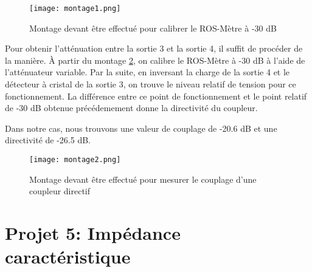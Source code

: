 \begin{figure}[htbp]
    \centering
    \texttt{[image: montage1.png]}
    \caption{Montage devant être effectué pour calibrer le ROS-Mètre à -30 dB}
    \label{montage1}
\end{figure}

Pour obtenir l'atténuation entre la sortie 3 et la sortie 4, il suffit de procéder de la manière. À partir du montage \ref{montage2}, on calibre le ROS-Mètre à -30 dB à l'aide de l'atténuateur variable. Par la suite, en inversant la charge de la sortie 4 et le détecteur à cristal de la sortie 3, on trouve le niveau relatif de tension pour ce fonctionnement. La différence entre ce point de fonctionnement et le point relatif de -30 dB obtenue précédemement donne la directivité du coupleur.

Dans notre cas, nous trouvons une valeur de couplage de -20.6 dB et une directivité de -26.5 dB.

\begin{figure}[htbp]
    \centering
    \texttt{[image: montage2.png]}
    \caption{Montage devant être effectué pour mesurer le couplage d'une coupleur directif}
    \label{montage2}
\end{figure}

\section{Projet 5: Impédance caractéristique}

